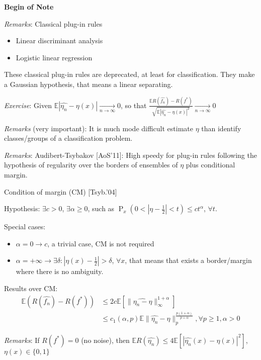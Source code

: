 		\textbf{Begin of Note}

		\emph{Remarks}: Classical plug-in rules
					\begin{itemize}
						\item Linear discriminant analysis		
						\item Logistic linear regression		
					\end{itemize}

		These classical plug-in rules are deprecated, at least for classification. They make a Gaussian hypothesis, that means a linear separating.

		\emph{Exercise}: Given $\mathbb{E}|\hat{{\eta}_n} - \eta(x)|  \xrightarrow[n\to \infty]{} 0$, so that $\frac{\mathbb{E}R(\hat{f_n})-R(f^*)}{\sqrt{\mathbb{E}|\hat{{\eta}_n}-\eta(x)|^2}} \xrightarrow[n\to \infty]{} 0$
		
		\emph{Remarks} (very important): It is much mode difficult  estimate $\eta$ than identify classes/groups of a classification problem.

		\emph{Remarks}: Audibert-Tsybakov [AoS'11]: High speedy for plug-in rules following the hypothesis of regularity over the borders of ensembles  of $\eta$ plus conditional margin.

		Condition of margin (CM) [Tsyb.'04]

		Hypothesis: $\exists c > 0$, $\exists \alpha \geq 0$, such as $\operatorname{P}_x(0<|\eta - \frac{1}{2}|<t)\leq ct^{\alpha}$, $\forall t$. 

		Special cases:
		\begin{itemize}
			\item $\alpha = 0 \to	c$, a trivial case, CM is not required	
			\item $\alpha = +\infty \to \exists \delta : |\eta(x) - \frac{1}{2}| > \delta$, $\forall x$, that means that exists a border/margin where there is no ambiguity. 		
		\end{itemize}

		Results over CM:
		  \begin{align*}
            \mathbb{E}(R(\hat{f_n})-R(f^*)) &\leq 2c\mathbb{E}[\|\hat{{\eta}_n - \eta}\|^{1+\alpha}_{\infty}]\\
						 &\leq c_1(\alpha,p)\mathbb{E}\|\hat{{\eta}_n}-\eta\|^{\frac{p(1+\alpha)}{p+\alpha}}_{p}, \forall p \geq 1, \alpha > 0
		  \end{align*}

		\emph{Remarks}:  If $R(f^*)=0$ (no noise), then $\mathbb{E}R(\hat{{\eta}_n})\leq 4\mathbb{E}[|\hat{{\eta}_n}(x)-\eta(x)|^2]$, $\eta(x)\in\{0,1\}$

